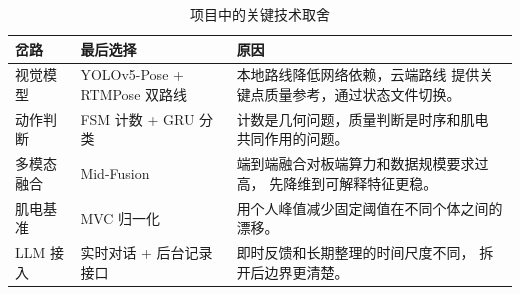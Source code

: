 \begin{table}[htbp]
\centering
\small
\begin{tabular}{@{}>{\raggedright\arraybackslash}p{}
                >{\raggedright\arraybackslash}p{}
                >{\raggedright\arraybackslash}p{}@{}}
\toprule
\textbf{岔路} & \textbf{最后选择} & \textbf{原因} \\
\midrule
视觉模型 & YOLOv5-Pose + RTMPose 双路线 & 本地路线降低网络依赖，云端路线
提供关键点质量参考，通过状态文件切换。 \\
动作判断 & FSM 计数 + GRU 分类 & 计数是几何问题，质量判断是时序和肌电
共同作用的问题。 \\
多模态融合 & Mid-Fusion & 端到端融合对板端算力和数据规模要求过高，
先降维到可解释特征更稳。 \\
肌电基准 & MVC 归一化 & 用个人峰值减少固定阈值在不同个体之间的漂移。 \\
LLM 接入 & 实时对话 + 后台记录接口 & 即时反馈和长期整理的时间尺度不同，
拆开后边界更清楚。 \\
\bottomrule
\end{tabular}
\caption{项目中的关键技术取舍}
\label{tab:decisions}
\end{table}
